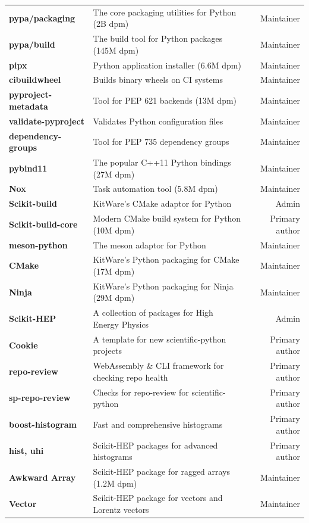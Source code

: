 \documentclass[10pt,letterpaper]{moderncv}
\begin{document}
\begin{tabularx}{\textwidth}{>{\bfseries}p{1.2in}>{\raggedright\arraybackslash}Xr}
    pypa/packaging & The core packaging utilities for Python (2B dpm) & Maintainer \\
    pypa/build & The build tool for Python packages (145M dpm) & Maintainer \\
    pipx & Python application installer (6.6M dpm) & Maintainer \\
    cibuildwheel & Builds binary wheels on CI systems & Maintainer \\
    pyproject-metadata & Tool for PEP 621 backends (13M dpm) & Maintainer \\
    validate-pyproject & Validates Python configuration files & Maintainer \\
    dependency-groups & Tool for PEP 735 dependency groups & Maintainer \\
    pybind11 & The popular C++11 Python bindings (27M dpm) & Maintainer \\
    Nox & Task automation tool (5.8M dpm) & Maintainer \\
    Scikit-build & KitWare's CMake adaptor for Python & Admin \\
    Scikit-build-core & Modern CMake build system for Python (10M dpm) & Primary author \\
    meson-python & The meson adaptor for Python & Maintainer \\
    CMake & KitWare's Python packaging for CMake (17M dpm) & Maintainer \\
    Ninja & KitWare's Python packaging for Ninja (29M dpm) & Maintainer \\
    Scikit-HEP & A collection of packages for High Energy Physics & Admin \\
    Cookie & A template for new scientific-python projects & Primary author \\
    repo-review & WebAssembly \& CLI framework for checking repo health & Primary author \\
    sp-repo-review & Checks for repo-review for scientific-python & Primary author \\
    boost-histogram & Fast and comprehensive histograms & Primary author \\
    hist, uhi & Scikit-HEP packages for advanced histograms & Primary author \\
    Awkward Array & Scikit-HEP package for ragged arrays (1.2M dpm) & Maintainer \\
    Vector & Scikit-HEP package for vectors and Lorentz vectors & Maintainer \\

\end{tabularx}
\end{document}
